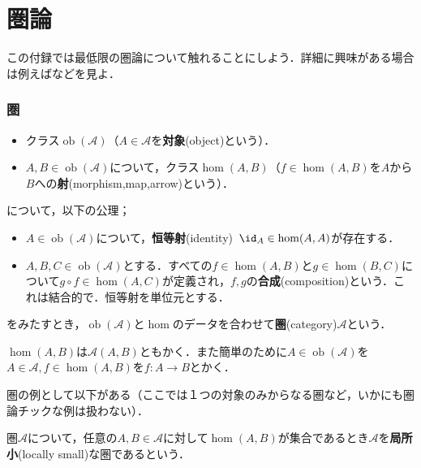 \part[Appendix \thepart, Category theory]{圏論}
この付録では最低限の圏論について触れることにしよう．詳細に興味がある場合は例えば\cite{siho}などを見よ．
\section{圏}

\begin{defi}[圏]
	\begin{itemize}
		\item クラス$\operatorname{ob}(\mathscr{A})$（$A\in\mathscr{A}$を\textbf{対象}(object)という）．
		\item $A,B\in\operatorname{ob}(\mathscr{A})$について，クラス$\hom (A,B)$（$f\in\hom(A,B)$を$A$から$B$への\textbf{射}(morphism,map,arrow)という）．
	\end{itemize}
	について，以下の公理；
	\begin{itemize}
		\item $A\in\operatorname{ob}(\mathscr{A})$について，\textbf{恒等射}(identity)~$\id_A\in\hom(A,A)$が存在する．
		\item $A,B,C\in\operatorname{ob}(\mathscr{A})$とする．すべての$f\in\hom(A,B)$と$g\in\hom(B,C)$について$g\circ f\in\hom(A,C)$が定義され，$f,g$の\textbf{合成}(composition)という．これは結合的で．恒等射を単位元とする．
	\end{itemize}
	をみたすとき，$\operatorname{ob}(\mathscr{A})$と$\hom$のデータを合わせて\textbf{圏}(category)$\mathscr{A}$という．
\end{defi}

$\hom(A,B)$は$\mathscr{A}(A,B)$ともかく．また簡単のために$A\in\operatorname{ob}(\mathscr{A})$を$A\in\mathscr{A},f\in\hom(A,B)$を$f:A\to B$とかく．

\begin{ex}
	圏の例として以下がある（ここでは１つの対象のみからなる圏など，いかにも圏論チックな例は扱わない）．
	
\end{ex}
\begin{defi}[局所小]
	圏$\mathscr{A}$について，任意の$A,B\in\mathscr{A}$に対して$\hom(A,B)$が集合であるとき$\mathscr{A}$を\textbf{局所小}(locally small)な圏であるという．
\end{defi}

